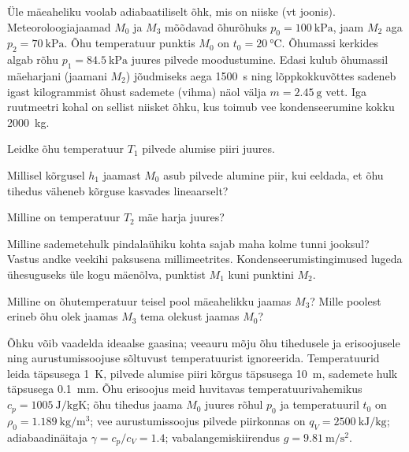 \documentclass[a4paper,11pt,twocolumn]{article}
\begin{document}
\begin{question}[IPhO 1987][ter1][8cm]
	Üle mäeaheliku voolab adiabaatiliselt õhk, mis on niiske (vt joonis). Meteoroloogiajaamad \( M_0 \) ja \( M_3 \) mõõdavad õhurõhuks \( p_0 = \SI{100}{\kilo\pascal} \), jaam \( M_2 \) aga \( p_2 = \SI{70}{\kilo\pascal} \). Õhu temperatuur punktis \( M_0 \) on \( t_0 = \SI{20}{\degreeCelsius}\). Õhumassi kerkides algab rõhu \( p_1 = \SI{84,5}{\kilo\pascal}\) juures pilvede moodustumine. Edasi kulub õhumassil mäeharjani (jaamani \( M_2 \)) jõudmiseks aega \SI{1500}{\s} ning lõppkokkuvõttes sadeneb igast kilogrammist õhust sademete (vihma) näol välja \( m = \SI{2,45}{\g}\) vett. Iga ruutmeetri kohal on sellist niisket õhku, kus toimub vee kondenseerumine kokku \SI{2000}{\kg}.
	\begin{subquestion}
		\item Leidke õhu temperatuur \( T_1 \) pilvede alumise piiri juures.
		\item Millisel kõrgusel \( h_1 \) jaamast \( M_0 \) asub pilvede alumine piir, kui eeldada, et õhu tihedus väheneb kõrguse kasvades lineaarselt?
		\item Milline on temperatuur \( T_2 \) mäe harja juures?
		\item Milline sademetehulk pindalaühiku kohta sajab maha kolme tunni jooksul? Vastus andke veekihi paksusena millimeetrites. Kondenseerumistingimused lugeda ühesuguseks üle kogu mäenõlva, punktist \( M_1 \) kuni punktini \( M_2 \).
		\item Milline on õhutemperatuur teisel pool mäeahelikku jaamas \( M_3 \)? Mille poolest erineb õhu olek jaamas \( M_3 \) tema olekust jaamas \( M_0 \)?
	\end{subquestion}
	\begin{hint}
		Õhku võib vaadelda ideaalse gaasina; veeauru mõju õhu tihedusele ja erisoojusele ning aurustumissoojuse sõltuvust temperatuurist ignoreerida. Temperatuurid leida täpsusega \SI{1}{\K}, pilvede alumise piiri kõrgus täpsusega \SI{10}{\m}, sademete hulk täpsusega \SI{0,1}{\mm}. Õhu erisoojus meid huvitavas temperatuurivahemikus \( c_p = \SI{1005}{\J\per\kg\K} \); õhu tihedus jaama \( M_0 \) juures rõhul \( p_0 \) ja temperatuuril \( t_0 \) on \( \rho_0 = \SI{1,189}{\kg\per\m\cubed} \); vee aurustumissoojus pilvede piirkonnas on \( q_V = \SI{2500}{\kJ\per\kg} \); adiabaadinäitaja \( \gamma = c_p/c_V = \num{1,4} \); vabalangemiskiirendus \( g = \SI{9,81}{\m\per\s\squared} \).
	\end{hint}
\end{question}
\end{document}
